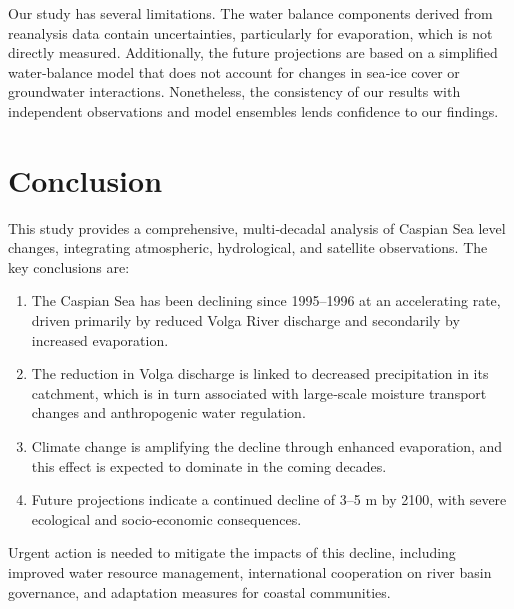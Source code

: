 \documentclass[12pt,a4paper]{article}
\begin{document}
Our study has several limitations. The water balance components derived from reanalysis data contain uncertainties, particularly for evaporation, which is not directly measured. Additionally, the future projections are based on a simplified water‑balance model that does not account for changes in sea‑ice cover or groundwater interactions. Nonetheless, the consistency of our results with independent observations and model ensembles lends confidence to our findings.

\section{Conclusion}

This study provides a comprehensive, multi‑decadal analysis of Caspian Sea level changes, integrating atmospheric, hydrological, and satellite observations. The key conclusions are:

\begin{enumerate}
    \item The Caspian Sea has been declining since 1995–1996 at an accelerating rate, driven primarily by reduced Volga River discharge and secondarily by increased evaporation.
    \item The reduction in Volga discharge is linked to decreased precipitation in its catchment, which is in turn associated with large‑scale moisture transport changes and anthropogenic water regulation.
    \item Climate change is amplifying the decline through enhanced evaporation, and this effect is expected to dominate in the coming decades.
    \item Future projections indicate a continued decline of 3–5 m by 2100, with severe ecological and socio‑economic consequences.
\end{enumerate}

Urgent action is needed to mitigate the impacts of this decline, including improved water resource management, international cooperation on river basin governance, and adaptation measures for coastal communities.
\end{document}
